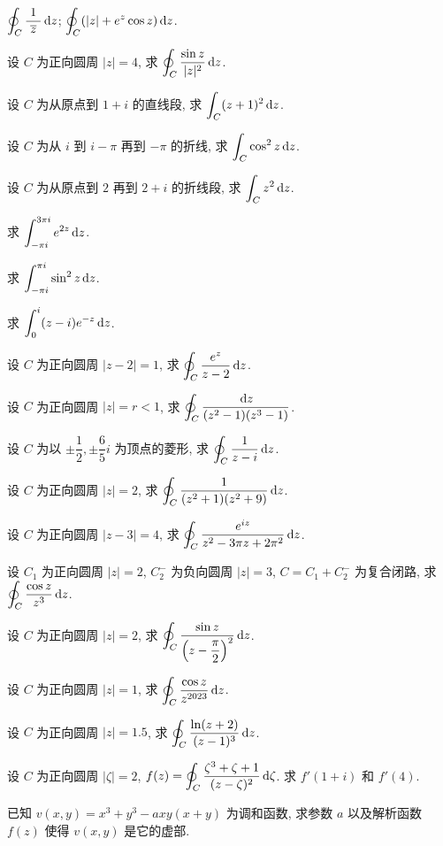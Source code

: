 \begin{homework}
\begin{exlist}
\begin{tasks}
				\task $\displaystyle\oint_C\dfrac{\ 1\ }{\overline z}\,\mathrm{d} z$;
				\task $\displaystyle\oint_C(|z|+e^z\cos z)\,\mathrm{d} z$.
			\end{tasks}
		\item 设 $C$ 为正向圆周 $|z|=4$, 求 $\displaystyle\oint_C\dfrac{\sin z}{|z|^2}\,\mathrm{d} z$.
		\item 设 $C$ 为从原点到 $1+i$ 的直线段, 求 $\displaystyle\int_C(z+1)^2\,\mathrm{d} z$.
		\item 设 $C$ 为从 $i$ 到 $i-\pi$ 再到 $-\pi$ 的折线, 求 $\displaystyle\int_C\cos^2z\,\mathrm{d} z$.
		\item 设 $C$ 为从原点到 $2$ 再到 $2+i$ 的折线段, 求 $\displaystyle\int_Cz^2\,\mathrm{d} z$.
		\item 求 $\displaystyle\int_{-\pi i}^{3\pi i}e^{2z}\,\mathrm{d} z$.
		\item 求 $\displaystyle\int_{-\pi i}^{\pi i}\sin^2z\,\mathrm{d} z$.
		\item 求 $\displaystyle\int_0^i(z-i)e^{-z}\,\mathrm{d} z$.
		\item 设 $C$ 为正向圆周 $|z-2|=1$, 求 
			$\displaystyle\oint_C\frac{e^z}{z-2}\,\mathrm{d} z$.
		\item 设 $C$ 为正向圆周 $|z|=r<1$, 求 
			$\displaystyle\oint_C\frac{\,\mathrm{d} z}{(z^2-1)(z^3-1)}$.
		\item 设 $C$ 为以 $\pm\dfrac12,\pm\dfrac65i$ 为顶点的菱形, 求 
			$\displaystyle\oint_C\frac{1}{z-i}\,\mathrm{d} z$.
		\item 设 $C$ 为正向圆周 $|z|=2$, 求 
			$\displaystyle\oint_C\frac1{(z^2+1)(z^2+9)}\,\mathrm{d} z$.
		\item 设 $C$ 为正向圆周 $|z-3|=4$, 求 
			$\displaystyle\oint_C\frac{e^{iz}}{z^2-3\pi z+2\pi^2}\,\mathrm{d} z$.
		\item 设 $C_1$ 为正向圆周 $|z|=2$, $C_2^-$ 为负向圆周 $|z|=3$, $C=C_1+C_2^-$ 为复合闭路, 求 
			$\displaystyle\oint_C\frac{\cos z}{z^3}\,\mathrm{d} z$.
		\item 设 $C$ 为正向圆周 $|z|=2$, 求 
			$\displaystyle\oint_C\frac{\sin z}{\left(z-\dfrac\pi 2\right)^2}\,\mathrm{d} z$.
		\item 设 $C$ 为正向圆周 $|z|=1$, 求 
			$\displaystyle\oint_C\frac{\cos z}{z^{2023}}\,\mathrm{d} z$.
		\item 设 $C$ 为正向圆周 $|z|=1.5$, 求 
			$\displaystyle\oint_C\frac{\ln(z+2)}{(z-1)^3}\,\mathrm{d} z$.
		\item 设 $C$ 为正向圆周 $|\zeta|=2$, $\displaystyle f(z)=\oint_C\dfrac{\zeta^3+\zeta+1}{(z-\zeta)^2}\,\mathrm{d}\zeta$.
			求 $f'(1+i)$ 和 $f'(4)$.
		\item 已知 $v(x,y)=x^3+y^3-axy(x+y)$ 为调和函数, 求参数 $a$ 以及解析函数 $f(z)$ 使得 $v(x,y)$ 是它的虚部.

\end{exlist}
\end{homework}
